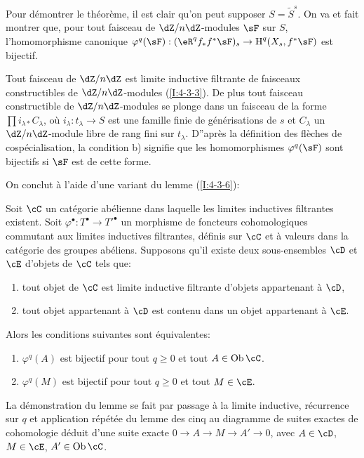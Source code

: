 Pour démontrer le théorème, il est clair qu'on peut supposer 
$S=\widetilde S^s$. On va et fait montrer que, pour tout faisceau de 
$\dZ/n\dZ$-modules $\sF$ sur $S$, l'homomorphisme canonique 
$\varphi^q(\sF):(\eR^q f_* f^* \sF)_s \to \h^q(X_s,f^*\sF)$ est bijectif. 

Tout faisceau de $\dZ/n\dZ$ est limite inductive filtrante de faisceaux 
constructibles de $\dZ/n\dZ$-modules (\ref{I:4-3-3}). De plus tout faisceau 
constructible de $\dZ/n\dZ$-modules se plonge dans un faisceau de la forme 
$\prod i_{\lambda *} C_\lambda$, où $i_\lambda:t_\lambda\to S$ est une 
famille finie de générisations de $s$ et $C_\lambda$ un $\dZ/n\dZ$-module 
libre de rang fini sur $t_\lambda$. D''après la définition des flèches de 
cospécialisation, la condition b) signifie que les homomorphismes 
$\varphi^q(\sF)$ sont bijectifs si $\sF$ est de cette forme. 

On conclut à l'aide d'une variant du lemme (\ref{I:4-3-6}):





\begin{lemma}\label{I:5-1-8}
Soit $\cC$ un catégorie abélienne dans laquelle les limites inductives 
filtrantes existent. Soit $\varphi^\bullet:T^\bullet\to{T'}^\bullet$ un 
morphisme de foncteurs cohomologiques commutant aux limites inductives 
filtrantes, définis sur $\cC$ et à valeurs dans la catégorie des groupes 
abéliens. Supposons qu'il existe deux sous-ensembles $\cD$ et $\cE$ d'objets 
de $\cC$ tels que:
\begin{enumerate}[\indent a)]
  \item tout objet de $\cC$ est limite inductive filtrante d'objets appartenant 
    à $\cD$, 
  \item tout objet appartenant à $\cD$ est contenu dans un objet appartenant 
    à $\cE$.
\end{enumerate}

Alors les conditions suivantes sont équivalentes: 
\begin{enumerate}[\indent (i)]
  \item $\varphi^q(A)$ est bijectif pour tout $q\geqslant 0$ et tout 
    $A\in\ob\cC$.
  \item $\varphi^q(M)$ est bijectif pour tout $q\geqslant 0$ et tout $M\in\cE$. 
\end{enumerate}
\end{lemma}

La démonstration du lemme se fait par passage à la limite inductive, 
récurrence sur $q$ et application répétée du lemme des cinq au diagramme 
de suites exactes de cohomologie déduit d'une suite exacte 
$0\to A\to M\to A'\to 0$, avec $A\in\cD$, $M\in\cE$, $A'\in \ob\cC$. 





